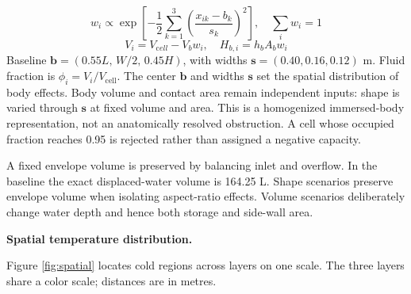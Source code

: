 \documentclass[12pt,a4paper]{article}
\begin{document}
\begin{equation}w_i\propto\exp\left[-\frac{1}{2}\sum_{k=1}^3\left(\frac{x_{ik}-b_k}{s_k}\right)^2\right],\quad \sum_iw_i=1\end{equation}
\begin{equation}V_i=V_{\mathrm cell}-V_bw_i,\quad H_{b,i}=h_bA_bw_i\end{equation}
Baseline $\mathbf{b}=(0.55L,\,W/2,\,0.45H)$, with widths $\mathbf{s}=(0.40,0.16,0.12)$ m. Fluid fraction is $\phi_i=V_i/V_{\mathrm{cell}}$. The center $\mathbf{b}$ and widths $\mathbf{s}$ set the spatial distribution of body effects. Body volume and contact area remain independent inputs: shape is varied through $\mathbf{s}$ at fixed volume and area. This is a homogenized immersed-body representation, not an anatomically resolved obstruction. A cell whose occupied fraction reaches 0.95 is rejected rather than assigned a negative capacity.

A fixed envelope volume is preserved by balancing inlet and overflow. In the baseline the exact displaced-water volume is 164.25 L. Shape scenarios preserve envelope volume when isolating aspect-ratio effects. Volume scenarios deliberately change water depth and hence both storage and side-wall area.

\textbf{Spatial temperature distribution.}

Figure \ref{fig:spatial} locates cold regions across layers on one scale. The three layers share a color scale; distances are in metres.
\end{document}
